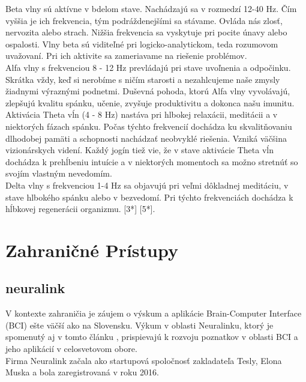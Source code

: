 \tab[5 mm]  Beta vlny sú aktívne v bdelom stave. Nachádzajú sa v rozmedzí 12-40 Hz. Čím vyššia je ich frekvencia, tým podráždenejšími sa stávame. Ovláda nás zlosť, nervozita alebo strach. Nižšia frekvencia sa vyskytuje pri pocite únavy alebo ospalosti. Vlny beta sú viditeľné pri logicko-analytickom, teda rozumovom uvažovaní. Pri ich aktivite sa zameriavame na riešenie problémov.\\
\tab[5 mm] Alfa vlny s frekvenciou 8 - 12 Hz prevládajú pri stave uvoľnenia a odpočinku. Skrátka vždy, keď si nerobíme s ničím starosti a nezahlcujeme naše zmysly žiadnymi výraznými podnetmi. Duševná pohoda, ktorú Alfa vlny vyvolávajú, zlepšujú kvalitu spánku, učenie, zvyšuje produktivitu a dokonca našu imunitu.\\
\tab[5 mm] Aktivácia Theta vĺn (4 - 8 Hz) nastáva pri hlbokej relaxácii, meditácii a v niektorých fázach spánku. Počas týchto frekvencií dochádza ku skvalitňovaniu dlhodobej pamäti a schopnosti nachádzať neobvyklé riešenia. Vzniká väčšina vizionárskych videní. Každý jogín tiež vie, že v stave aktivácie Theta vĺn dochádza k prehĺbeniu intuície a v niektorých momentoch sa možno stretnúť so svojím vlastným nevedomím.\\
\tab[5 mm] Delta vlny s frekvenciou 1-4 Hz sa objavujú pri veľmi dôkladnej meditáciu, v stave hlbokého spánku alebo v bezvedomí. Pri týchto frekvenciách dochádza k hĺbkovej regenerácii organizmu.
[3*] [5*].
\section{Zahraničné Prístupy}
\subsection{neuralink}
\tab[5 mm] V kontexte zahraničia je záujem o výskum a aplikácie Brain-Computer Interface (BCI) ešte väčší ako na Slovensku. Výkum v oblasti Neuralinku, ktorý je spomenutý aj v tomto článku \cite{fiani2021examination}, prispievajú k rozvoju poznatkov v oblasti BCI a jeho aplikácií v celosvetovom obore.\\
\tab[5 mm] Firma Neuralink začala ako startupová spoločnosť zakladateľa Tesly, Elona Muska a bola zaregistrovaná v roku 2016. 
